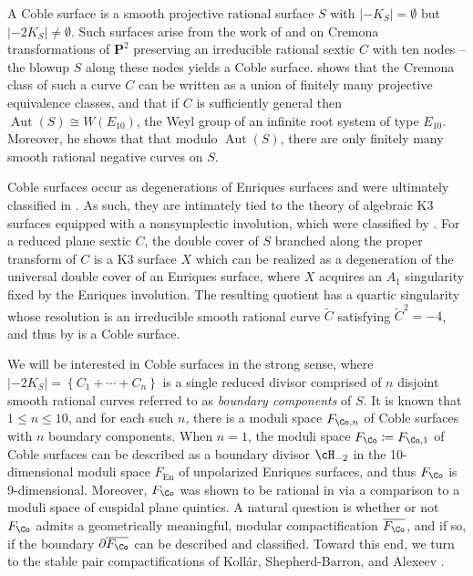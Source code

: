 \documentclass{amsart}
\renewcommand{\tilde}{\widetilde}
\begin{document}
\begin{remark}

A Coble surface is a smooth projective rational surface \(S\) with \({\left\lvert {-K_S} \right\rvert} = \emptyset\) but \({\left\lvert {-2K_S} \right\rvert}\neq \emptyset\). Such surfaces arise from the work of \cite{Cob19} and \cite{Cob29} on Cremona transformations of \({\mathbf{P}}^2\) preserving an irreducible rational sextic \(C\) with ten nodes -- the blowup \(S\) along these nodes yields a Coble surface. \cite{Cob19} shows that the Cremona class of such a curve \(C\) can be written as a union of finitely many projective equivalence classes, and that if \(C\) is sufficiently general then \(\mathop{\mathrm{Aut}}(S) \cong W(E_{10})\), the Weyl group of an infinite root system of type \(E_{10}\). Moreover, he shows that that modulo \(\mathop{\mathrm{Aut}}(S)\), there are only finitely many smooth rational negative curves on \(S\).

Coble surfaces occur as degenerations of Enriques surfaces and were ultimately classified in \cite{DZ99}. As such, they are intimately tied to the theory of algebraic K3 surfaces equipped with a nonsymplectic involution, which were classified by \cite{nikulin1979quotient-groups}. For a reduced plane sextic \(C\), the double cover of \(S\) branched along the proper transform of \(C\) is a K3 surface \(X\) which can be realized as a degeneration of the universal double cover of an Enriques surface, where \(X\) acquires an \(A_1\) singularity fixed by the Enriques involution. The resulting quotient has a quartic singularity whose resolution is an irreducible smooth rational curve \(\tilde C\) satisfying \(\tilde C^2 = -4\), and thus by \cite[\S 3]{Nue16} is a Coble surface.

We will be interested in Coble surfaces in the strong sense, where \({\left\lvert {-2K_S} \right\rvert} = \left\{{C_1 + \cdots + C_n}\right\}\) is a single reduced divisor comprised of \(n\) disjoint smooth rational curves referred to as \emph{boundary components} of \(S\). It is known that \(1\leq n\leq 10\), and for each such \(n\), there is a moduli space \(F_{\Co, n}\) of Coble surfaces with \(n\) boundary components. When \(n=1\), the moduli space \(F_{\Co} \coloneqq F_{\Co, 1}\) of Coble surfaces can be described as a boundary divisor \(\cH_{-2}\) in the 10-dimensional moduli space \(F_{\operatorname{En}}\) of unpolarized Enriques surfaces, and thus \(F_{\Co}\) is 9-dimensional. Moreover, \(F_{\Co}\) was shown to be rational in \cite{DK13} via a comparison to a moduli space of cuspidal plane quintics. A natural question is whether or not \(F_{\Co}\) admits a geometrically meaningful, modular compactification \(\overline{F_{\Co}}\), and if so, if the boundary \(\partial \overline{F_{\Co}}\) can be described and classified. Toward this end, we turn to the stable pair compactifications of Kollár, Shepherd-Barron, and Alexeev \cite{kollar1988threefolds-and-deformations,alexeev1996moduli-spaces,Kol23}.

\end{remark}
\end{document}

